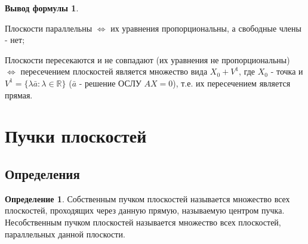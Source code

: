 \documentclass[a4paper, 12pt]{article}
\theoremstyle{definition}
\newtheorem*{definition}{Определение}
\newtheorem*{formula}{Вывод формулы}
\begin{document}
\begin{formula}
\begin{center}
			Плоскости параллельны $\Leftrightarrow$ их уравнения пропорциональны, а свободные члены - нет;

			Плоскости пересекаются и не совпадают (их уравнения не пропорциональны) $\Leftrightarrow$ пересечением плоскостей является множество вида $X_0 + V^1$, где $X_0$ - точка и $V^1 = \{\lambda \bar{a}: \lambda \in \mathbb{R}\}$ ($\bar{a}$ - решение ОСЛУ $AX=0$), т.е. их пересечением является прямая.
		\end{center}
	\end{formula}
	\section{Пучки плоскостей}
	\subsection{Определения}
	\begin{definition}
		Собственным пучком плоскостей называется множество всех плоскостей, проходящих через данную прямую, называемую центром пучка.\\
		Несобственным пучком плоскостей называется множество всех плоскостей, параллельных данной плоскости.
	\end{definition}
\end{document}
